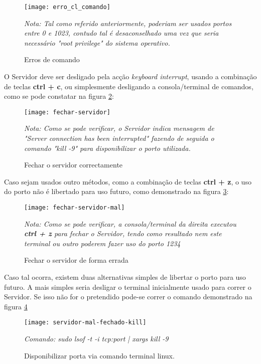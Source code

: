 \begin{center}
	\begin{figure}[H]
		\centering
		\texttt{[image: erro\_cl\_comando]}
		\caption{Erros de comando\\}
		\label{fig:erro_cl_comando}
		\flushleft\small\textit{Nota: Tal como referido anteriormente, poderiam ser usados portos entre 0 e 1023, contudo tal é desaconselhado uma vez que seria necessário "root privilege" do sistema operativo.}
	\end{figure}
\end{center}
		


O Servidor deve ser desligado pela acção \textit{keyboard interrupt}, usando a combinação de teclas \textbf{ctrl + c}, ou simplesmente desligando a consola/terminal de comandos, como se pode constatar na figura \ref{fig:fechar-servidor}: 

\begin{center}	
	\begin{figure}[H]
		\centering
		\texttt{[image: fechar-servidor]}
		\caption{Fechar o servidor correctamente\\}
		\label{fig:fechar-servidor}
		\flushleft\small\textit{Nota: Como se pode verificar, o Servidor indica mensagem de "S\textit{erver connection has been interrupted}" fazendo de seguida o comando "\textit{kill -9}" para disponibilizar o porto utilizada.}
	\end{figure}
\end{center}

Caso sejam usados outro métodos, como a combinação de teclas \textbf{ctrl + z}, o uso do porto não é libertado para uso futuro, como demonstrado na figura \ref{fig:fechar-servidor-mal}:

\begin{center}	
	\begin{figure}[H]
		\centering
		\texttt{[image: fechar-servidor-mal]}
		\caption{Fechar o servidor de forma errada\\}
		\label{fig:fechar-servidor-mal}
		\flushleft\small\textit{Nota: Como se pode verificar, a consola/terminal da direita executou \textbf{ctrl + z} para fechar o Servidor, tendo como resultado nem este terminal ou outro poderem fazer uso do porto 1234}
	\end{figure}
\end{center}

Caso tal ocorra, existem duas alternativas simples de libertar o porto para uso futuro. A mais simples seria desligar o terminal inicialmente usado para correr o Servidor. Se isso não for o pretendido pode-se correr o comando demonstrado na figura \ref{fig:servidor-mal-fechado-kill}
\begin{center}	
	\begin{figure}[H]
		\centering
		\texttt{[image: servidor-mal-fechado-kill]}
		\caption{Disponibilizar porta via comando terminal linux.\\}
		\label{fig:servidor-mal-fechado-kill}
		\center\small\textit{Comando: sudo lsof -t -i tcp:port | xargs kill -9}
	\end{figure}
\end{center}

